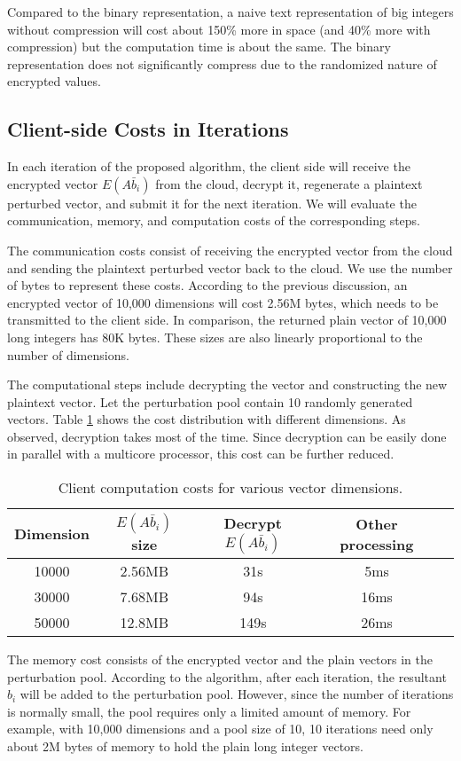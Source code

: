 \documentclass[10pt, conference, compsocconf]{IEEEtran}
\begin{document}
Compared to the binary representation, a naive text representation of big integers without compression will cost about 150\% more in space (and 40\% more with compression) but the computation time is about the same. 
The binary representation does not significantly compress due to the randomized nature of encrypted values. 

\subsection{Client-side Costs in Iterations}
In each iteration of the proposed algorithm, the client side will receive the encrypted vector $E(A\bar{b}_i)$ from the cloud, decrypt it, regenerate a plaintext perturbed vector, and submit it for the next iteration. We will evaluate the communication, memory, and computation costs of the corresponding steps.  

The communication costs consist of receiving the encrypted vector from the cloud and sending the plaintext perturbed vector back to the cloud. We use the number of bytes to represent these costs. According to the previous discussion, an encrypted vector of 10,000 dimensions will cost 2.56M bytes, which needs to be transmitted to the client side. In comparison, the returned plain vector of 10,000 long integers has 80K bytes. These sizes are also linearly proportional to the number of dimensions.

The computational steps include decrypting the vector and constructing the new plaintext vector. Let the perturbation pool contain 10 randomly generated vectors. Table \ref{tab:client-comp-cost} shows the cost distribution with different dimensions. As observed, decryption takes most of the time. Since decryption can be easily done in parallel with a multicore processor, this cost can be further reduced.   

\begin{table}[tbh]
\centering
\scriptsize
\begin{tabular}{|c|c|c|c|c|}
\hline
Dimension & $E(A\bar{b}_i)$ size & Decrypt $E(A\bar{b}_i)$ & Other processing \\
\hline
10000& 2.56MB& 31s & 5ms \\
30000& 7.68MB &94s & 16ms \\
50000& 12.8MB & 149s & 26ms \\
\hline
\end{tabular}
\caption{Client computation costs for various vector dimensions.} \label{tab:client-comp-cost}
\vspace{-0.5cm}
\normalsize
\end{table}
The memory cost consists of the encrypted vector and the plain vectors in the perturbation pool. According to the algorithm, after each iteration, the resultant $b_i$ will be added to the perturbation pool. However, since the number of iterations is normally small, the pool requires only a limited amount of memory. For example, with 10,000 dimensions and a pool size of 10, 10 iterations need only about 2M bytes of memory to hold the plain long integer vectors.
\end{document}
